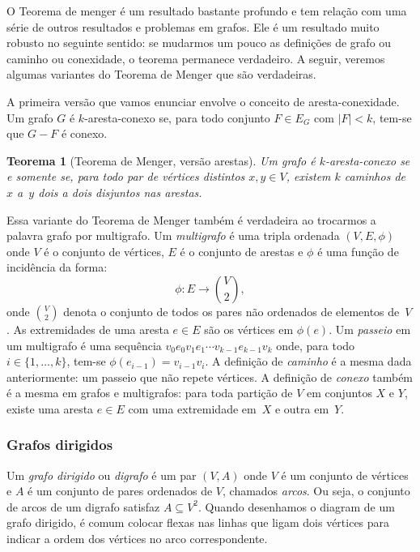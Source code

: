 \documentclass[12pt, a4paper]{article}
\newtheorem{teor}{Teorema}[section]
\theoremstyle{definition}
\begin{document}
O Teorema de menger é um resultado bastante profundo e tem relação com uma série de outros resultados e problemas em grafos. Ele é um resultado muito robusto no seguinte sentido: se mudarmos um pouco as definições de grafo ou caminho ou conexidade, o teorema permanece verdadeiro. A seguir, veremos algumas variantes do Teorema de Menger que são verdadeiras.

A primeira versão que vamos enunciar envolve o conceito de aresta-conexidade. Um grafo $G$ é $k$-aresta-conexo se, para todo conjunto $F \in E_G$ com $|F| < k$, tem-se que $G - F$ é conexo. 

\begin{teor}[Teorema de Menger, versão arestas]
  \label{teor:menger4}
  Um grafo é $k$-aresta-conexo se e somente se, para todo par de vértices distintos $x,y \in V$, existem $k$ caminhos de~$x$ a~$y$ dois a dois disjuntos nas arestas.
\end{teor}

Essa variante do Teorema de Menger também é verdadeira ao trocarmos a palavra grafo por multigrafo. Um \emph{multigrafo} é uma tripla ordenada $(V,E,\phi)$ onde $V$ é o conjunto de vértices, $E$ é o conjunto de arestas e $\phi$ é uma função de incidência da forma:
\[\phi : E \rightarrow \binom{V}{2},\]
onde $\binom{V}{2}$ denota o conjunto de todos os pares não ordenados de elementos de~$V$. As extremidades de uma aresta $e \in E$ são os vértices em $\phi(e)$. Um \emph{passeio} em um multigrafo é uma sequência $v_0e_0v_1e_1 \cdots v_{k-1}e_{k-1}v_k$ onde, para todo $i \in \{1,\dots,k\}$, tem-se $\phi(e_{i-1}) = v_{i-1}v_i$. A definição de \emph{caminho} é a mesma dada anteriormente: um passeio que não repete vértices. A definição de \emph{conexo} também é a mesma em grafos e multigrafos: para toda partição de $V$ em conjuntos $X$ e $Y$, existe uma aresta $e \in E$ com uma extremidade em~$X$ e outra em~$Y$.

\subsubsection {Grafos dirigidos}

Um \emph{grafo dirigido} ou \emph{digrafo} é um par $(V,A)$ onde $V$ é um conjunto de vértices e $A$ é um conjunto de pares ordenados de $V$, chamados \emph{arcos}. Ou seja, o conjunto de arcos de um digrafo satisfaz $A \subseteq V^2$. Quando desenhamos o diagram de um grafo dirigido, é comum colocar flexas nas linhas que ligam dois vértices para indicar a ordem dos vértices no arco correspondente. 
\end{document}
